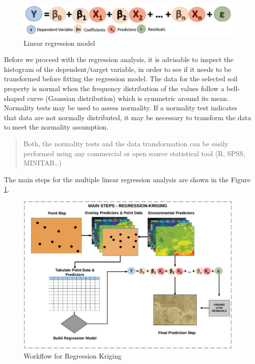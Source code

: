 \documentclass[10pt,b5paper,]{book}
\theoremstyle{definition}
\theoremstyle{definition}
\theoremstyle{definition}
\theoremstyle{remark}
\begin{document}
\begin{figure}
\centering
\includegraphics{images/RKequation.png}
\caption{Linear regression model}
\end{figure}

Before we proceed with the regression analysis, it is advisable to
inspect the histogram of the dependent/target variable, in order to see
if it needs to be transformed before fitting the regression model. The
data for the selected soil property is normal when the frequency
distribution of the values follow a bell-shaped curve (Gaussian
distribution) which is symmetric around its mean. Normality tests may be
used to assess normality. If a normality test indicates that data are
not normally distributed, it may be necessary to transform the data to
meet the normality assumption.

\begin{quote}
Both, the normality tests and the data transformation can be easily
performed using any commercial or open source statistical tool (R, SPSS,
MINITAB\ldots{})
\end{quote}

The main steps for the multiple linear regression analysis are shown in
the Figure \ref{fig:workflowRK}.

\begin{figure}

{\centering \includegraphics[width=0.8\linewidth]{images/RKworkflow} 

}

\caption{Workflow for Regression Kriging}\label{fig:workflowRK}
\end{figure}
\end{document}
